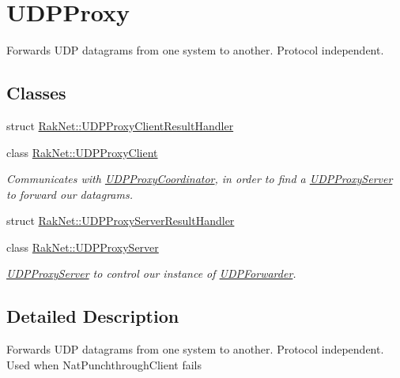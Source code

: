\hypertarget{group___u_d_p___p_r_o_x_y___g_r_o_u_p}{\section{U\-D\-P\-Proxy}
\label{group___u_d_p___p_r_o_x_y___g_r_o_u_p}
}


Forwards U\-D\-P datagrams from one system to another. Protocol independent.  


\subsection*{Classes}
\begin{DoxyCompactItemize}
\item 
struct \hyperlink{struct_rak_net_1_1_u_d_p_proxy_client_result_handler}{Rak\-Net\-::\-U\-D\-P\-Proxy\-Client\-Result\-Handler}
\item 
class \hyperlink{class_rak_net_1_1_u_d_p_proxy_client}{Rak\-Net\-::\-U\-D\-P\-Proxy\-Client}
\begin{DoxyCompactList}\small\item\em Communicates with \hyperlink{class_rak_net_1_1_u_d_p_proxy_coordinator}{U\-D\-P\-Proxy\-Coordinator}, in order to find a \hyperlink{class_rak_net_1_1_u_d_p_proxy_server}{U\-D\-P\-Proxy\-Server} to forward our datagrams. \end{DoxyCompactList}\item 
struct \hyperlink{struct_rak_net_1_1_u_d_p_proxy_server_result_handler}{Rak\-Net\-::\-U\-D\-P\-Proxy\-Server\-Result\-Handler}
\item 
class \hyperlink{class_rak_net_1_1_u_d_p_proxy_server}{Rak\-Net\-::\-U\-D\-P\-Proxy\-Server}
\begin{DoxyCompactList}\small\item\em \hyperlink{class_rak_net_1_1_u_d_p_proxy_server}{U\-D\-P\-Proxy\-Server} to control our instance of \hyperlink{class_rak_net_1_1_u_d_p_forwarder}{U\-D\-P\-Forwarder}. \end{DoxyCompactList}\end{DoxyCompactItemize}


\subsection{Detailed Description}
Forwards U\-D\-P datagrams from one system to another. Protocol independent. Used when Nat\-Punchthrough\-Client fails 